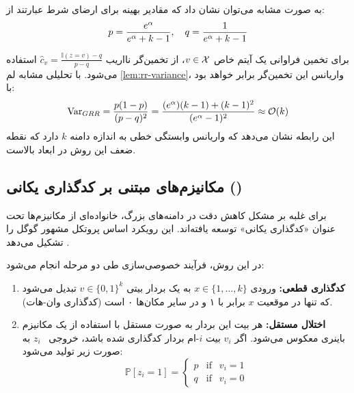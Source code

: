 به صورت مشابه  می‌توان نشان داد که
مقادیر بهینه برای ارضای شرط \LDP عبارتند از:
\begin{equation}
p = \frac{e^{\alpha}}{e^{\alpha} + k - 1}, \quad q = \frac{1}{e^{\alpha} + k - 1}
\end{equation}

برای تخمین فراوانی یک آیتم خاص $v \in \Xset$، از تخمین‌گر نااریب $\hat{c}_v = \frac{\mathbb{I}(z=v) - q}{p-q}$ استفاده می‌شود. با تحلیلی مشابه لم \ref{lem:rr-variance}، واریانس این تخمین‌گر برابر خواهد بود با:
\begin{equation}
\label{eq:grr-var-derivation}
\mathrm{Var}_{GRR} = \frac{p(1-p)}{(p-q)^2} = \frac{(e^{\alpha})(k-1) + (k-1)^2}{(e^{\alpha} - 1)^2} \approx \mathcal{O}(k)
\end{equation}
این رابطه نشان می‌دهد که واریانس  وابستگی خطی به اندازه دامنه $k$ دارد که نقطه ضعف این روش در ابعاد بالاست.

\subsection{مکانیزم‌های مبتنی بر کدگذاری یکانی ()}
\label{sec:ldp:ue}

برای غلبه بر مشکل کاهش دقت  در دامنه‌های بزرگ، خانواده‌ای از مکانیزم‌ها تحت عنوان «کدگذاری یکانی» توسعه یافته‌اند. این رویکرد اساس پروتکل مشهور  گوگل را تشکیل می‌دهد \cite{Erlingsson2014, Wang2020}.

\begin{تعریف}
در این روش، فرآیند خصوصی‌سازی طی دو مرحله انجام می‌شود:
\begin{enumerate}
    \item \textbf{کدگذاری قطعی:} ورودی $x \in \{1, \dots, k\}$ به یک بردار بیتی $v \in \{0, 1\}^k$ تبدیل می‌شود که تنها در موقعیت $x$ برابر با ۱ و در سایر مکان‌ها ۰ است (کدگذاری وان-هات).
    \item \textbf{اختلال مستقل:} هر بیت این بردار به صورت مستقل با استفاده از یک مکانیزم باینری معکوس می‌شود. اگر $v_i$ بیت $i$-ام بردار کدگذاری شده باشد، خروجی \ $z_i$ به صورت زیر تولید می‌شود:
    \begin{equation}
    \mathbb{P}\left[z_i = 1\right] = 
    \begin{cases} 
    p & \text{if } \ \ v_i = 1 \\
    q & \text{if } \ \ v_i = 0
    \end{cases}
    \end{equation}
\end{enumerate}
\end{تعریف}

